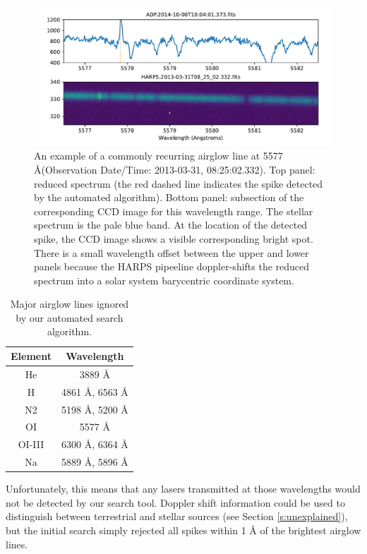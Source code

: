 \documentclass[twocolumn]{aastex701}
\begin{document}
\begin{figure}
    \centering
    \includegraphics[width=\textwidth]{clean-figures/airglowexample.pdf}
    \caption{An example of a commonly recurring airglow line at 5577 \AA (Observation Date/Time: 2013-03-31, 08:25:02.332). Top panel: reduced spectrum (the red dashed line indicates the spike detected by the automated algorithm).  Bottom panel: subsection of the corresponding CCD image for this wavelength range. The stellar spectrum is the pale blue band. At the location of the detected spike, the CCD image shows a visible corresponding bright spot.  There is a small wavelength offset between the upper and lower panels because the HARPS pipeeline doppler-shifts the reduced spectrum into a solar system barycentric coordinate system.}
    \label{fig:airglowexample}
\end{figure}

\begin{table}
\begin{center}
\begin{tabular}{|c|c|} 
 \hline
 Element & Wavelength \\ 
 \hline
 He & 3889 \AA \\ 
 \hline
 H & 4861 \AA, 6563 \AA \\ 
 \hline
 N2 & 5198 \AA, 5200 \AA \\ 
 \hline
 OI & 5577 \AA \\
 \hline
 OI-III & 6300 \AA, 6364 \AA \\
 \hline
 Na & 5889 \AA , 5896 \AA \\
 \hline
 \end{tabular}
\end{center}
 \caption{Major airglow lines ignored by our automated search algorithm.}
 \label{table:AirglowWavelengths}
\end{table}

Unfortunately, this means that any lasers transmitted at those wavelengths would not be detected by our search tool.  Doppler shift information could be used to distinguish between terrestrial and stellar sources (see Section \ref{s:unexplained}), but the initial search simply rejected all spikes within 1 {\AA} of the brightest airglow lines.
\end{document}
